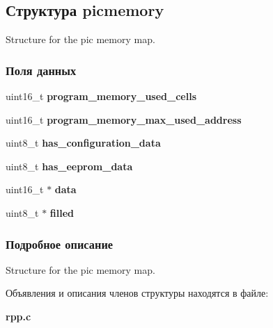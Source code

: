 \subsection{Структура picmemory}
\label{structpicmemory}


Structure for the pic memory map.  


\subsubsection*{Поля данных}
\begin{DoxyCompactItemize}
\item 
\mbox{\label{structpicmemory_af2f97782cfcb1a25625f11e7dacb2473}} 
uint16\+\_\+t {\bfseries program\+\_\+memory\+\_\+used\+\_\+cells}
\item 
\mbox{\label{structpicmemory_a3830ee3000036862542dc8c941a262c7}} 
uint16\+\_\+t {\bfseries program\+\_\+memory\+\_\+max\+\_\+used\+\_\+address}
\item 
\mbox{\label{structpicmemory_a32595ad3aeb400678ddf99d199bf4096}} 
uint8\+\_\+t {\bfseries has\+\_\+configuration\+\_\+data}
\item 
\mbox{\label{structpicmemory_a2ae425275d79f023c2d98cf8f52afc44}} 
uint8\+\_\+t {\bfseries has\+\_\+eeprom\+\_\+data}
\item 
\mbox{\label{structpicmemory_aa11cb56dc3945193f794dd520f0e7af6}} 
uint16\+\_\+t $\ast$ {\bfseries data}
\item 
\mbox{\label{structpicmemory_a21d4a02816052215e133fbf29dc3eaa0}} 
uint8\+\_\+t $\ast$ {\bfseries filled}
\end{DoxyCompactItemize}


\subsubsection{Подробное описание}
Structure for the pic memory map. 

Объявления и описания членов структуры находятся в файле\+:\begin{DoxyCompactItemize}
\item 
\textbf{ rpp.\+c}\end{DoxyCompactItemize}
